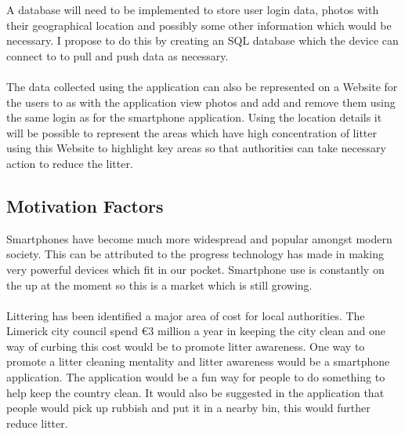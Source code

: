 \documentclass[12pt]{article}
\begin{document}
A database will need to be implemented to store user login data, photos with their geographical location and possibly some other information which would be necessary. I propose to do this by creating an SQL database which the device can connect to to pull and push data as necessary.

\paragraph{}
\label{par:Website}

The data collected using the application can also be represented on a Website for the users to as with the application view photos and add and remove them using the same login as for the smartphone application.  Using the location details it will be possible to represent the areas which have high concentration of litter using this Website to highlight key areas so that authorities can take necessary action to reduce the litter.




\subsection{Motivation Factors}

Smartphones have become much more widespread and popular amongst modern society. This can be attributed to the progress technology has made in making very powerful devices which fit in our pocket. Smartphone use is constantly on the up at the moment so this is a market which is still growing. 

\paragraph{}
\label{par:2par}

Littering has been identified a major area of cost for local authorities. The Limerick city council spend €3 million a year in keeping the city clean and one way of curbing this cost would be to promote litter awareness.
One way to promote a litter cleaning mentality and litter awareness would be a smartphone application. The application would be a fun way for people to do something to help keep the country clean. It would also be suggested in the application that people would pick up rubbish and put it in a nearby bin, this would further reduce litter.
\end{document}
